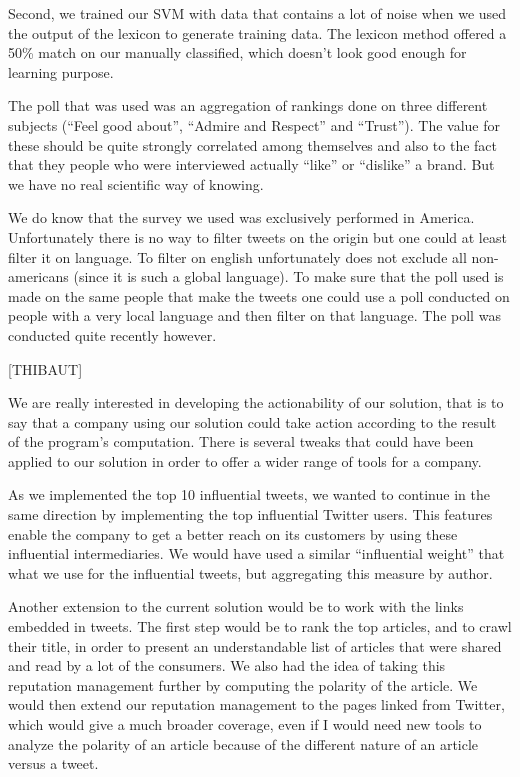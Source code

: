 \documentclass[a4paper,12pt]{report}
\begin{document}
Second, we trained our SVM with data that contains a lot of noise when we used the output of the lexicon to generate training data. The lexicon method offered a 50\% match on our manually classified, which doesn’t look good enough for learning purpose.

The poll that was used was an aggregation of rankings done on three different subjects (“Feel good about”, “Admire and Respect” and “Trust”). The value for these should be quite strongly correlated among themselves and also to the fact that they people who were interviewed actually “like” or “dislike” a brand. But we have no real scientific way of knowing.

We do know that the survey we used was exclusively performed in America. Unfortunately there is no way to filter tweets on the origin but one could at least filter it on language. To filter on english unfortunately does not exclude all non-americans (since it is such a global language). To make sure that the poll used is made on the same people that make the tweets one could use a poll conducted on people with a very local language and then filter on that language. The poll was conducted quite recently however.

[THIBAUT]

We are really interested in developing the actionability of our solution, that is to say that a company using our solution could take action according to the result of the program’s computation. There is several tweaks that could have been applied to our solution in order to offer a wider range of tools for a company.

As we implemented the top 10 influential tweets, we wanted to continue in the same direction by implementing the top influential Twitter users. This features enable the company to get a better reach on its customers by using these influential intermediaries. We would have used a similar “influential weight” that what we use for the influential tweets, but aggregating this measure by author.

Another extension to the current solution would be to work with the links embedded in tweets. The first step would be to rank the top articles, and to crawl their title, in order to present an understandable list of articles that were shared and read by a lot of the consumers. We also had the idea of taking this reputation management further by computing the polarity of the article. We would then extend our reputation management to the pages linked from Twitter, which would give a much broader coverage, even if I would need new tools to analyze the polarity of an article because of the different nature of an article versus a tweet.
\end{document}
